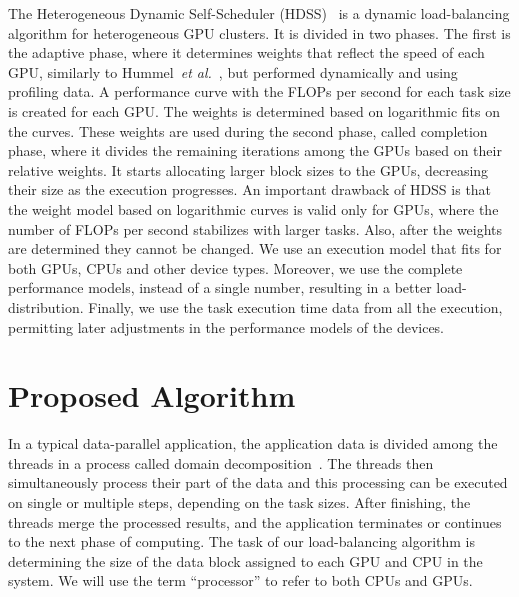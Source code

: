 \documentclass[journal]{IEEEtran}
\begin{document}
The Heterogeneous Dynamic Self-Scheduler (HDSS)~\cite{HDSS} is a dynamic
load-balancing algorithm for heterogeneous GPU clusters. It is divided in two
phases. The first is the adaptive phase, where it determines weights that
reflect the speed of each GPU, similarly to Hummel~\textit{et al.}~\cite{Hummel},
but performed dynamically and using profiling data. A performance curve with the
FLOPs per second for each task size is created for each GPU. The weights is
determined based on logarithmic fits on the curves.  These weights are used
during the second phase, called completion phase, where it divides the remaining
iterations among the GPUs based on their relative weights. It starts allocating
larger block sizes to the GPUs, decreasing their size as the execution
progresses. An important drawback of HDSS is that the weight model based on
logarithmic curves is valid only for GPUs, where the number of FLOPs per second
stabilizes with larger tasks. Also, after the weights are determined they cannot
be changed. We use an execution model that fits for both GPUs, CPUs and other
device types. Moreover, we use the complete performance models, instead of a
single number, resulting in a better load-distribution. Finally, we use the task
execution time data from all the execution, permitting later adjustments in the
performance models of the devices.



\section{Proposed Algorithm}

In a typical data-parallel application, the application data is divided among
the threads in a process called domain decomposition~\cite{Gropp:1992uq}. The
threads then simultaneously process their part of the data and this processing
can be executed on single or multiple steps, depending on the task sizes. After
finishing, the threads merge the processed results, and the application
terminates or continues to the next phase of computing. The task of our
load-balancing algorithm is determining the size of the data block assigned to
each GPU and CPU in the system. We will use the term ``processor'' to refer to
both CPUs and GPUs.

\end{document}
